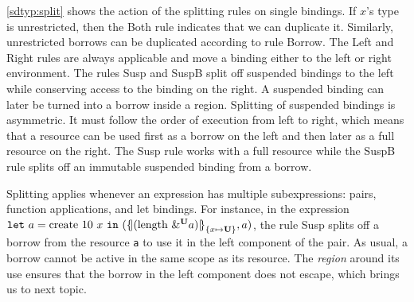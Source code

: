 \cref{sdtyp:split} shows the action of the splitting rules on single
bindings. If $x$'s type is unrestricted, then
the {\sc Both} rule indicates that we can duplicate it.
Similarly, unrestricted borrows can be duplicated according to rule
{\sc Borrow}.
The {\sc Left} and {\sc Right} rules are always applicable and move a binding
either to the left or right environment.
The rules {\sc Susp} and {\sc SuspB} split off suspended bindings to
the left while conserving access to the binding on the right.
A suspended binding can later be turned
into a borrow inside a region. Splitting of suspended bindings is
asymmetric. It must follow the order of execution from left to right,
which means that a resource can be used first as a borrow on the left 
and then later as a full resource on the right. The {\sc Susp} rule
works with a full resource while the {\sc SuspB} 
rule splits off an immutable suspended binding from a borrow.

Splitting applies whenever an
expression has multiple subexpressions:  pairs, function applications,
and let bindings. For instance, in the
expression
$\letin{a}{\text{create}\ 10\ x}
{\introPair{\region[{}]{\Sone x\IBORROW}{\app{\text{length}}{\borrow[\IBORROW]{a}}}}{a}}$,
the rule {\sc Susp} splits off a borrow from  the resource
\lstinline/a/ to use it in the left component of the pair.
As usual, a borrow cannot be active in the same scope as its resource.
The \emph{region} around its use ensures that the borrow in the left component does not
escape, which brings us to next topic.



